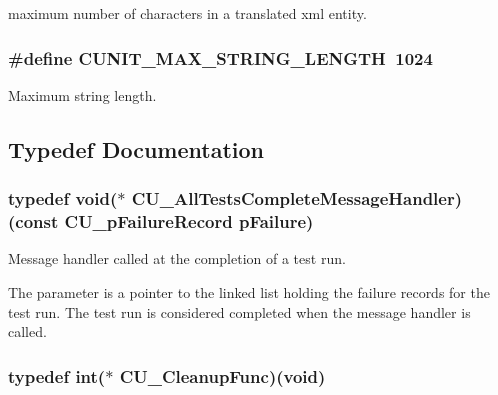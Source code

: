 maximum number of characters in a translated xml entity. 

\hypertarget{group___framework_ga8c2ccf441412e1f4eda2fdc5cfcbf899}{
\subsubsection[{C\+U\+N\+I\+T\+\_\+\+M\+A\+X\+\_\+\+S\+T\+R\+I\+N\+G\+\_\+\+L\+E\+N\+G\+T\+H}]{\setlength{\rightskip}{0pt plus 5cm}\#define C\+U\+N\+I\+T\+\_\+\+M\+A\+X\+\_\+\+S\+T\+R\+I\+N\+G\+\_\+\+L\+E\+N\+G\+T\+H~1024}}\label{group___framework_ga8c2ccf441412e1f4eda2fdc5cfcbf899}


Maximum string length. 



\subsection{Typedef Documentation}
\hypertarget{group___framework_ga5c8cffc5ce2801990436b3e6992bf770}{
\subsubsection[{C\+U\+\_\+\+All\+Tests\+Complete\+Message\+Handler}]{\setlength{\rightskip}{0pt plus 5cm}typedef void($\ast$ C\+U\+\_\+\+All\+Tests\+Complete\+Message\+Handler)(const {\bf C\+U\+\_\+p\+Failure\+Record} p\+Failure)}}\label{group___framework_ga5c8cffc5ce2801990436b3e6992bf770}


Message handler called at the completion of a test run. 

The parameter is a pointer to the linked list holding the failure records for the test run. The test run is considered completed when the message handler is called. \hypertarget{group___framework_ga90966c0bede742195897c3aeff4c342b}{
\subsubsection[{C\+U\+\_\+\+Cleanup\+Func}]{\setlength{\rightskip}{0pt plus 5cm}typedef int($\ast$ C\+U\+\_\+\+Cleanup\+Func)(void)}}\label{group___framework_ga90966c0bede742195897c3aeff4c342b}


